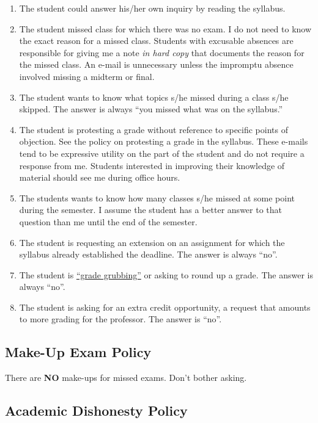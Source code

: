 \documentclass[11pt,]{article}
\providecommand{\tightlist}{%
  \setlength{\itemsep}{0pt}\setlength{\parskip}{0pt}}
\begin{document}
\begin{enumerate}
\def\labelenumi{\arabic{enumi}.}
\tightlist
\item
  The student could answer his/her own inquiry by reading the syllabus.
\item
  The student missed class for which there was no exam. I do not need to
  know the exact reason for a missed class. Students with excusable
  absences are responsible for giving me a note \emph{in hard copy} that
  documents the reason for the missed class. An e-mail is unnecessary
  unless the impromptu absence involved missing a midterm or final.
\item
  The student wants to know what topics s/he missed during a class s/he
  skipped. The answer is always ``you missed what was on the syllabus.''
\item
  The student is protesting a grade without reference to specific points
  of objection. See the policy on protesting a grade in the syllabus.
  These e-mails tend to be expressive utility on the part of the student
  and do not require a response from me. Students interested in
  improving their knowledge of material should see me during office
  hours.
\item
  The students wants to know how many classes s/he missed at some point
  during the semester. I assume the student has a better answer to that
  question than me until the end of the semester.
\item
  The student is requesting an extension on an assignment for which the
  syllabus already established the deadline. The answer is always
  ``no''.
\item
  The student is
  \href{https://www.math.uh.edu/~tomforde/GradeGrubbing.html}{``grade
  grubbing''} or asking to round up a grade. The answer is always
  ``no''.
\item
  The student is asking for an extra credit opportunity, a request that
  amounts to more grading for the professor. The answer is ``no''.
\end{enumerate}

\subsection{Make-Up Exam Policy}\label{make-up-exam-policy}

There are \textbf{NO} make-ups for missed exams. Don't bother asking.

\subsection{Academic Dishonesty
Policy}\label{academic-dishonesty-policy}
\end{document}
